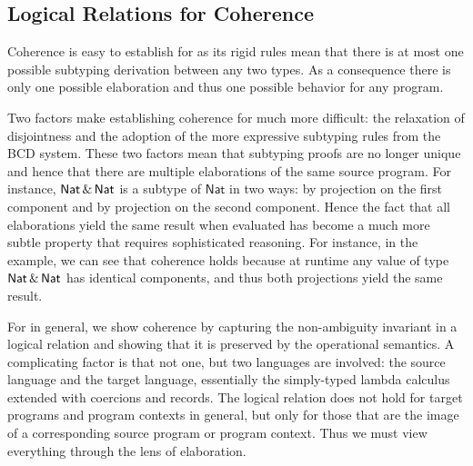 
\subsection{Logical Relations for Coherence}

Coherence is easy to establish for \oname as its rigid rules mean that there is
at most one possible subtyping derivation between any two types.  As a
consequence there is only one possible elaboration and thus one
possible behavior for any program.

Two factors make establishing coherence for \name much more difficult: the
relaxation of disjointness and the adoption of the more expressive subtyping
rules from the BCD system. These two factors mean that subtyping proofs are no
longer unique and hence that there are multiple elaborations of the same source
program. For instance, $\mathsf{Nat} \,\&\, \mathsf{Nat}$ is a subtype of $\mathsf{Nat}$ in two
ways: by projection on the first component and by projection on the second
component.
Hence the fact that all elaborations yield the same result when evaluated has
become a much more subtle property that requires sophisticated reasoning.
For instance, in the example, we can see that coherence holds because  at
runtime any value of type $\mathsf{Nat} \,\&\, \mathsf{Nat}$ has identical components, and
thus both projections yield the same result.

For \name in general, we show coherence by capturing the non-ambiguity
invariant in a logical relation and showing that it is preserved by the
operational semantics. A complicating factor is that not one, but two languages
are involved: the source language \name and the target language, essentially
the simply-typed lambda calculus extended with coercions and records. The
logical relation does not hold for target programs and program contexts in
general, but only for those that are the image of a corresponding source
program or program context. Thus we must view everything through the lens of
elaboration.

